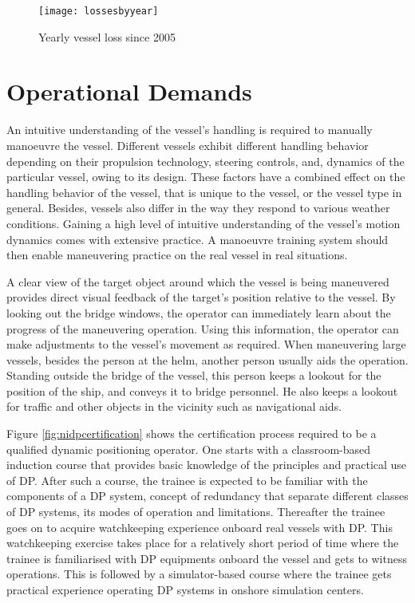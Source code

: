 \begin{figure}
	\centering
	\texttt{[image: lossesbyyear]}
	\caption{Yearly vessel loss since 2005}
	\label{fig:lossesbyyear}
\end{figure}

\section{Operational Demands}
\label{sec:operationaldemands}
An intuitive understanding of the vessel’s handling is required to manually manoeuvre the vessel. Different vessels exhibit different handling behavior depending on their propulsion technology, steering controls, and, dynamics of the particular vessel, owing to its design. These factors have a combined effect on the handling behavior of the vessel, that is unique to the vessel, or the vessel type in general. Besides, vessels also differ in the way they respond to various weather conditions. 
Gaining a high level of intuitive understanding of the vessel’s motion dynamics comes with extensive practice. A manoeuvre training system should then enable maneuvering practice on the real vessel in real situations.

A clear view of the target object around which the vessel is being maneuvered provides direct visual feedback of the target’s position relative to the vessel. By looking out the bridge windows, the operator can immediately learn about the progress of the maneuvering operation. Using this information, the operator can make adjustments to the vessel's movement as required. When maneuvering large vessels, besides the person at the helm, another person usually aids the operation. Standing outside the bridge of the vessel, this person keeps a lookout for the position of the ship, and conveys it to bridge personnel. He also keeps a lookout for traffic and other objects in the vicinity such as navigational aids.

Figure \ref{fig:nidpcertification} shows the certification process required to be a qualified dynamic positioning operator. One starts with a classroom-based induction course that provides basic knowledge of the principles and practical use of DP. After such a course, the trainee is expected to be familiar with the components of a DP system, concept of redundancy that separate different classes of DP systems, its modes of operation and limitations. Thereafter the trainee goes on to acquire watchkeeping experience onboard real vessels with DP. This watchkeeping exercise takes place for a relatively short period of time where the trainee is familiarised with DP equipments onboard the vessel and gets to witness operations. This is followed by a simulator-based course where the trainee gets practical experience operating DP systems in onshore simulation centers. 

